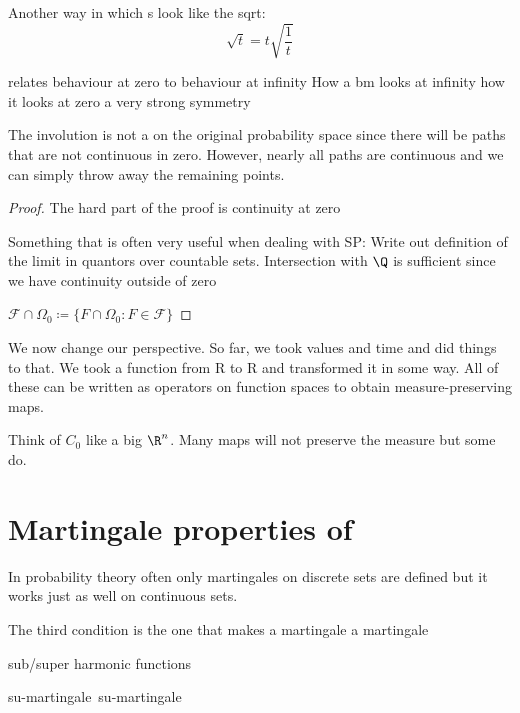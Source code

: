 Another way in which \BM s look like the sqrt:
\[\sqrt t = t\sqrt{\frac1t}\]

relates behaviour at zero to behaviour at infinity
How a bm looks at infinity how it looks at zero
a very strong symmetry

The involution is not a \BM on the original probability space
since there will be paths that are not continuous in zero.
However, nearly all paths are continuous
and we can simply throw away the remaining points.

\begin{prop}
\end{prop}
\begin{proof}
	The hard part of the proof is continuity at zero

	Something that is often very useful when dealing with SP:
	Write out definition of the limit in quantors over countable sets.
	Intersection with \(\Q\) is sufficient
	since we have continuity outside of zero %

	\(\mathcal F \cap \Omega_0 \coloneqq \{F \cap \Omega_0 : F \in \mathcal F\}\)
\end{proof}

We now change our perspective.
So far, we took values and time and did things to that.
We took a function from R to R and transformed it in some way.
All of these can be written as operators on function spaces
to obtain measure-preserving maps.

\begin{bem}
\end{bem}

Think of \(C_0\) like a big \(\R^n\).
Many maps will not preserve the measure but some do.

\section{Martingale properties of \BM}

In probability theory often only martingales on discrete sets are defined
but it works just as well on continuous sets.

\begin{defi}
	The third condition is the one that makes a martingale a martingale

	sub/super harmonic functions

	\def\bup{\sffamily b\hspace*{-7.6pt}\raisebox{3pt}{\(\uparrow\)}}
	\def\pdown{\sffamily p\hspace*{-7.6pt}\raisebox{-3pt}{\(\downarrow\)}}
	\def\submart{\textsf{su\rlap{\bup}\phantom{b}-martingale}}
	\def\supmart{\textsf{su\rlap{\pdown}\phantom{p}-martingale}}
	\submart\ \supmart
\end{defi}

